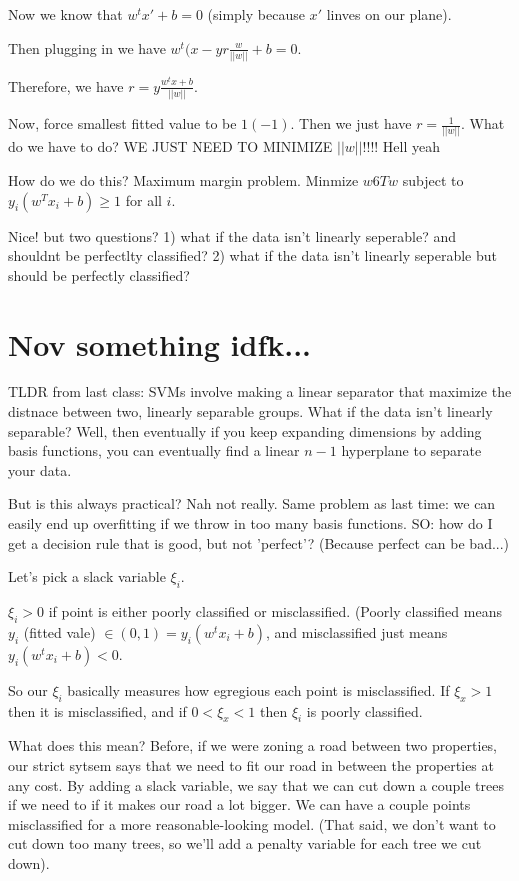 \documentclass[12pt]{article}
\begin{document}
Now we know that $w^tx' + b=0$ (simply because $x'$ linves on our plane).

Then plugging in we have $w^t(x-yr\frac{w}{||w||} + b = 0$. 

Therefore, we have $r = y\frac{w^tx+b}{||w||}$.

Now, force smallest fitted value to be $1 (-1)$. Then we just have $r =  \frac{1}{||w||}$. What do we have to do? WE JUST NEED TO MINIMIZE $||w||$!!!! Hell yeah

How do we do this? Maximum margin problem. Minmize $w6Tw$ subject to $y_i(w^Tx_i + b) \geq 1$ for all $i$.

Nice! but two questions? 1) what if the data isn't linearly seperable? and shouldnt be perfectlty classified? 2) what if the data isn't linearly seperable but should be perfectly classified?

\section{Nov something idfk...}



TLDR from last class: SVMs involve making a linear separator that maximize the distnace between two, linearly separable groups. What if the data isn't linearly separable? Well, then eventually if you keep expanding dimensions by adding basis functions, you can eventually find a linear $n-1$ hyperplane to separate your data. 

But is this always practical? Nah not really. Same problem as last time: we can easily end up overfitting if we throw in too many basis functions. SO: how do I get a decision rule that is good, but not 'perfect'? (Because perfect can be bad...)


Let's pick a slack variable $\xi_i$. 

$\xi_i > 0$ if point is either poorly classified or misclassified. (Poorly classified means $y_i$ (fitted vale) $\in (0,1) = y_i(w^tx_i+b)$, and misclassified just means $y_i(w^tx_i+b) < 0$. 

So our $\xi_i$ basically measures how egregious each point is misclassified. If $\xi_x > 1$ then it is misclassified, and if $0 < \xi_x < 1$ then $\xi_i$ is poorly classified. 

What does this mean? Before, if we were zoning a road between two properties, our strict sytsem says that we need to fit our road in between the properties at any cost. By adding a slack variable, we say that we can cut down a couple trees if we need to if it makes our road a lot bigger. We can have a couple points misclassified for a more reasonable-looking model. (That said, we don't want to cut down too many trees, so we'll add a penalty variable for each tree we cut down).
\end{document}
